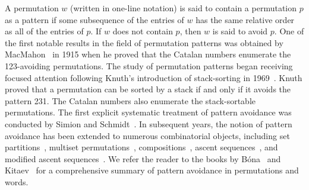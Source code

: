 \documentclass[a4paper, 11pt]{article}
\theoremstyle{definition}
\begin{document}
A permutation $w$ (written in one-line notation) is said to contain a permutation 
$p$ as a pattern if some subsequence of the entries of $w$ has the same relative 
order as all of the entries of $p$. If $w$ does not contain $p$, then $w$ is said 
to avoid $p$. One of the first notable results in the field of permutation patterns 
was obtained by MacMahon~\cite{MacMahon1915} in 1915 when he proved that the Catalan 
numbers enumerate the 123-avoiding permutations. The study of permutation patterns 
began receiving focused attention following Knuth's introduction of stack-sorting in 
1969~\cite{Knuth1969}. Knuth proved that a permutation can be sorted by a stack if 
and only if it avoids the pattern 231. The Catalan numbers also enumerate the 
stack-sortable permutations. The first explicit systematic treatment of pattern 
avoidance was conducted by Simion and Schmidt~\cite{simionschmidt}.
In subsequent years, the notion of pattern avoidance has been extended to 
numerous combinatorial objects, including  
set partitions~\cite{Duncan2011, Jelinek2013, Sagan2006},
multiset permutations~\cite{Heubach2006, Savage2006}, 
compositions~\cite{Heubach2006, k-ary, Savage2006},
ascent sequences~\cite{Conway2022,Duncan2011,Egge2022},
and modified ascent sequences~\cite{modasc,modasc2}.
We refer the reader to the books by Bóna~\cite{Bona2022} and Kitaev~\cite{Kitaev2011}
for a comprehensive summary of pattern avoidance in permutations and words.
\end{document}
